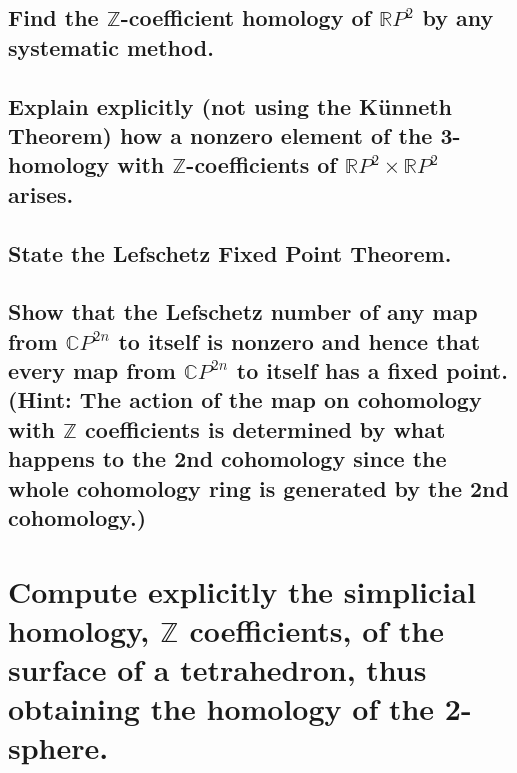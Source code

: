 \documentclass[10pt]{article}
\newcommand{\advsection}{\addtocounter{section}{1} \setcounter{subsection}{0}}
\newcommand{\hint}[1]{(Hint: #1)}
\begin{document}
\advsection{}

\subsection{Find the $\mathbb{Z}$-coefficient homology of $\mathbb{R} P^2$ by any systematic
  method.}

\subsection{Explain explicitly (not using the K\"unneth Theorem) how a nonzero element of the
  3-homology with $\mathbb{Z}$-coefficients of $\mathbb{R} P^2 \times \mathbb{R} P^2$ arises.}

\advsection{}

\subsection{State the Lefschetz Fixed Point Theorem.}

\subsection{Show that the Lefschetz number of any map from $\mathbb{C} P^{2n}$ to itself is nonzero
  and hence that every map from $\mathbb{C} P^{2n}$ to itself has a fixed point. \hint{The action of
    the map on cohomology with $\mathbb{Z}$ coefficients is determined by what happens to the 2nd
    cohomology since the whole cohomology ring is generated by the 2nd cohomology.}}

\section{Compute explicitly the simplicial homology, $\mathbb{Z}$ coefficients, of the surface of a
  tetrahedron, thus obtaining the homology of the 2-sphere.}
\end{document}
